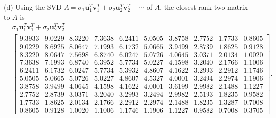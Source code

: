 \documentclass{homework}
\begin{document}
{\noindent(d) Using the SVD $A = \sigma_1 \mathbf u_1^T \mathbf v_1^T + \sigma_2 \mathbf u_2^T \mathbf v_2^T + \cdots$ of $A$, the closest rank-two matrix to $A$ is 
\begin{align*}
    &\sigma_1 \mathbf u_1^T \mathbf v_1^T + \sigma_2 \mathbf u_2^T \mathbf v_2^T = \\&\begin{bmatrix}
        9.3933  &  9.0229  &  8.3220  &  7.3638  &  6.2411  &  5.0505  &  3.8758  &  2.7752  &  1.7733  &  0.8605 \\
        9.0229  &  8.6925  &  8.0647  &  7.1993  &  6.1732  &  5.0665  &  3.9499  &  2.8739  &  1.8625  &  0.9128 \\
        8.3220  &  8.0647  &  7.5698  &  6.8740  &  6.0247  &  5.0726  &  4.0645  &  3.0371  &  2.0134  &  1.0020 \\
        7.3638  &  7.1993  &  6.8740  &  6.3952  &  5.7734  &  5.0227  &  4.1598  &  3.2040  &  2.1766  &  1.1006 \\
        6.2411  &  6.1732  &  6.0247  &  5.7734  &  5.3932  &  4.8607  &  4.1622  &  3.2993  &  2.2912  &  1.1746 \\
        5.0505  &  5.0665  &  5.0726  &  5.0227  &  4.8607  &  4.5327  &  4.0001  &  3.2494  &  2.2974  &  1.1906 \\
        3.8758  &  3.9499  &  4.0645  &  4.1598  &  4.1622  &  4.0001  &  3.6199  &  2.9982  &  2.1488  &  1.1227 \\
        2.7752  &  2.8739  &  3.0371  &  3.2040  &  3.2993  &  3.2494  &  2.9982  &  2.5193  &  1.8235  &  0.9582 \\
        1.7733  &  1.8625  &  2.0134  &  2.1766  &  2.2912  &  2.2974  &  2.1488  &  1.8235  &  1.3287  &  0.7008 \\
        0.8605  &  0.9128  &  1.0020  &  1.1006  &  1.1746  &  1.1906  &  1.1227  &  0.9582  &  0.7008  &  0.3705 
    \end{bmatrix}.
\end{align*}

}
\end{document}
